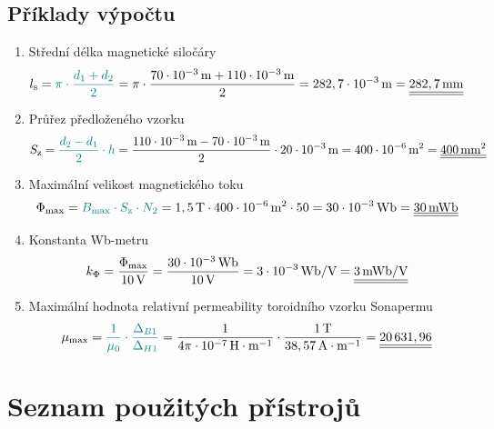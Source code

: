 \documentclass[a4paper, czech]{article}
\begin{document}
\subsection{Příklady výpočtu}

\begin{enumerate}
    \item Střední délka magnetické siločáry
    \begin{multline*}
        l_\text{s} = \textcolor{teal}{\pi \cdot \frac{d_1 + d_2}{2}} = \pi \cdot \frac{70 \cdot 10^{-3}\,\text{m} + 110 \cdot 10^{-3}\,\text{m}}{2} = 282,7 \cdot 10^{-3}\,\text{m} = \underline{\underline{282,7\,\text{mm}}} \hfill
    \end{multline*}
    \item Průřez předloženého vzorku
    \begin{multline*}
        S_\text{z} = \textcolor{teal}{\frac{d_2 - d_1}{2} \cdot h} = \frac{110 \cdot 10^{-3}\,\text{m} - 70 \cdot 10^{-3}\,\text{m}}{2} \cdot 20 \cdot 10^{-3}\,\text{m} = 400 \cdot 10^{-6}\,\text{m}^2 = \underline{\underline{400\,\text{mm}^2}} \hfill
    \end{multline*}
    \item Maximální velikost magnetického toku
    \begin{multline*}
        \Phi_{\text{max}} = \textcolor{teal}{B_\text{max} \cdot S_\text{z} \cdot N_2} = 1,5\,\text{T} \cdot 400 \cdot 10^{-6}\,\text{m}^2 \cdot 50 = 30 \cdot 10^{-3}\,\text{Wb} = \underline{\underline{30\,\text{mWb}}} \hfill
    \end{multline*}
    \item{Konstanta Wb-metru}
    \begin{multline*}
        k_\Phi = \frac{\Phi_{\text{max}}}{10\,\text{V}} = \frac{30 \cdot 10^{-3}\,\text{Wb}}{10\,\text{V}} = 3 \cdot 10^{-3}\,\text{Wb/V} = \underline{\underline{3\,\text{mWb/V}}} \hfill
    \end{multline*}
    \item Maximální hodnota relativní permeability toroidního vzorku Sonapermu
    \begin{multline*}
        \mu_\text{max} = \textcolor{teal}{\frac{1}{\mu_0} \cdot \frac{\Delta_{B1}}{\Delta_{H1}}} = \frac{1}{4 \pi \cdot 10^{-7}\,\text{H}\cdot\text{m}^{-1}} \cdot \frac{1\,\text{T}}{38,57\,\text{A}\cdot\text{m}^{-1}} = \underline{\underline{20\,631,96}} \hfill
    \end{multline*}
\end{enumerate}

\section{Seznam použitých přístrojů}
\end{document}
